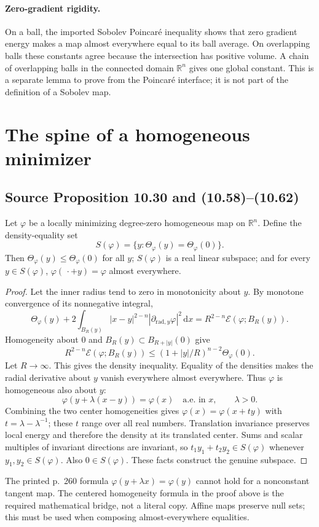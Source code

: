 \documentclass[11pt,a4paper]{article}
\numberwithin{equation}{section}
\theoremstyle{definition}
\theoremstyle{remark}
\newcommand{\R}{\mathbb R}
\newcommand{\dd}{\,\mathrm d}
\newcommand{\E}{\mathcal E}
\newcommand{\Th}{\Theta}
\begin{document}
\paragraph{Zero-gradient rigidity.}\label{lem:zero-gradient}
On a ball, the imported Sobolev Poincar\'e inequality shows that zero
gradient energy makes a map almost everywhere equal to its ball average.
On overlapping balls these constants agree because the intersection has
positive volume. A chain of overlapping balls in the connected domain
$\R^n$ gives one global constant. This is a separate lemma to prove from
the Poincar\'e interface; it is not part of the definition of a Sobolev map.

\section{The spine of a homogeneous minimizer}
\subsection{Source Proposition 10.30 and (10.58)--(10.62)}
\label{prop:spine}
Let $\varphi$ be a locally minimizing degree-zero homogeneous map on
$\R^n$. Define the density-equality set
\begin{equation}\label{def:spine}
 S(\varphi)=\{y:\Th_\varphi(y)=\Th_\varphi(0)\}.
\end{equation}
Then $\Th_\varphi(y)\le\Th_\varphi(0)$ for all $y$; $S(\varphi)$ is
a real linear subspace; and for every $y\in S(\varphi)$,
$\varphi(\,\cdot+y)=\varphi$ almost everywhere.

\begin{proof}
Let the inner radius tend to zero in monotonicity about $y$. By monotone
convergence of its nonnegative integral,
\[
 \Th_\varphi(y)+2\int_{B_R(y)}|x-y|^{2-n}
       |\partial_{\mathrm{rad},y}\varphi|^2\dd x
 =R^{2-n}\E(\varphi;B_R(y)).
\]
Homogeneity about $0$ and $B_R(y)\subset B_{R+|y|}(0)$ give
\[
 R^{2-n}\E(\varphi;B_R(y))
 \le(1+|y|/R)^{n-2}\Th_\varphi(0).
\]
Let $R\to\infty$. This gives the density inequality. Equality of the
densities makes the radial derivative about $y$ vanish everywhere almost
everywhere. Thus $\varphi$ is homogeneous also about $y$:
\[
 \varphi(y+\lambda(x-y))=\varphi(x)\quad\text{a.e. in }x,
 \qquad\lambda>0.
\]
Combining the two center homogeneities gives
$\varphi(x)=\varphi(x+ty)$ with $t=\lambda-\lambda^{-1}$;
these $t$ range over all real numbers. Translation invariance preserves
local energy and therefore the density at its translated center. Sums and
scalar multiples of invariant directions are invariant, so
$t_1y_1+t_2y_2\in S(\varphi)$ whenever $y_1,y_2\in S(\varphi)$.
Also $0\in S(\varphi)$. These facts construct the genuine subspace.
\end{proof}
The printed p.~260 formula $\varphi(y+\lambda x)=\varphi(y)$ cannot
hold for a nonconstant tangent map. The centered homogeneity formula in
the proof above is the required mathematical bridge, not a literal copy.
Affine maps preserve null sets; this must be used when composing
almost-everywhere equalities.
\end{document}
